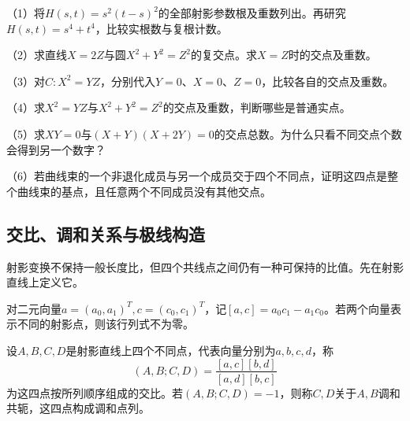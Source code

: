 \begin{exercise}
\mbox{}\par\nobreak
\begin{samepage}
（1）将\(H(s,t)=s^2(t-s)^2\)的全部射影参数根及重数列出。再研究\(H(s,t)=s^4+t^4\)，比较实根数与复根计数。
\par
\end{samepage}

\begin{samepage}
（2）求直线\(X=2Z\)与圆\(X^2+Y^2=Z^2\)的复交点。求\(X=Z\)时的交点及重数。
\par
\end{samepage}

\begin{samepage}
（3）对\(C:X^2=YZ\)，分别代入\(Y=0\)、\(X=0\)、\(Z=0\)，比较各自的交点及重数。
\par
\end{samepage}

\begin{samepage}
（4）求\(X^2=YZ\)与\(X^2+Y^2=Z^2\)的交点及重数，判断哪些是普通实点。
\par
\end{samepage}

\begin{samepage}
（5）求\(XY=0\)与\((X+Y)(X+2Y)=0\)的交点总数。为什么只看不同交点个数会得到另一个数字？
\par
\end{samepage}

\begin{samepage}
（6）若曲线束的一个非退化成员与另一个成员交于四个不同点，证明这四点是整个曲线束的基点，且任意两个不同成员没有其他交点。
\par
\end{samepage}
\end{exercise}

\subsection{交比、调和关系与极线构造}
\label{subsec:quadratic-cross-ratio-and-harmonicity}

射影变换不保持一般长度比，但四个共线点之间仍有一种可保持的比值。先在射影直线上定义它。

对二元向量\(a=(a_0,a_1)^T,c=(c_0,c_1)^T\)，记\([a,c]=a_0c_1-a_1c_0\)。若两个向量表示不同的射影点，则该行列式不为零。

\begin{definition}
设\(A,B,C,D\)是射影直线上四个不同点，代表向量分别为\(a,b,c,d\)，称
\begin{equation}\label{eq:quadratic-cross-ratio-definition}
 (A,B;C,D)=\frac{[a,c][b,d]}{[a,d][b,c]}
\end{equation}
为这四点按所列顺序组成的{\heiti{}交比}。若\((A,B;C,D)=-1\)，则称\(C,D\)关于\(A,B\){\heiti{}调和共轭}，这四点构成{\heiti{}调和点列}。
\end{definition}

